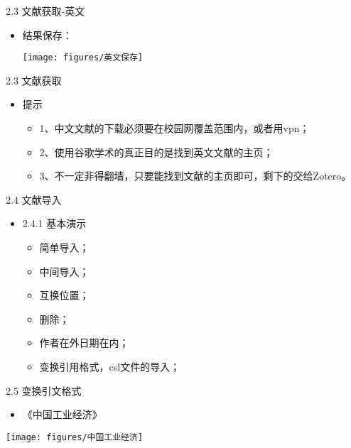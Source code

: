 \documentclass{beamer}%
\begin{document}
\begin{frame}[t]{2.3 文献获取-英文}
\begin{itemize}
\item 结果保存：
\begin{center}
		\texttt{[image: figures/英文保存]}
\end{center}
\end{itemize}
\end{frame}



\begin{frame}[t]{2.3 文献获取}
\begin{itemize}
  \item 提示
  \begin{itemize}
    \item 1、中文文献的下载必须要在校园网覆盖范围内，或者用vpn；
    \item 2、使用谷歌学术的真正目的是找到英文文献的主页；
    \item 3、不一定非得翻墙，只要能找到文献的主页即可，剩下的交给Zotero。
  \end{itemize}
\end{itemize}
\end{frame}



\begin{frame}[t]{2.4 文献导入}
\begin{itemize}
  \item 2.4.1 基本演示
  \begin{itemize}
    \item 简单导入；
    \item 中间导入；
    \item 互换位置；
    \item 删除；
    \item 作者在外日期在内；
    \item 变换引用格式，csl文件的导入；
  \end{itemize}
\end{itemize}
\end{frame}

\begin{frame}[t]{2.5 变换引文格式}
\begin{itemize}
  \item 《中国工业经济》
\end{itemize}
\vspace{-0.2cm} %
\begin{center}
	\texttt{[image: figures/中国工业经济]}
\end{center}
\end{frame}
\end{document}
